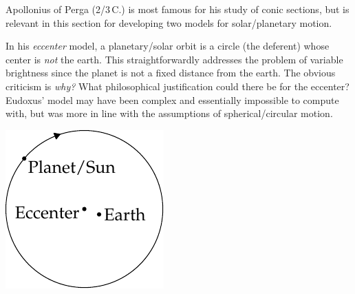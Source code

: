 \begin{minipage}[t]{0.74\linewidth}\vspace{0pt}
 Apollonius of Perga (2\nd/3\rd{}\,C.\BC) is most famous for his study of conic sections, but is relevant in this section for developing two models for solar/planetary motion.\smallbreak

In his \emph{eccenter} model, a planetary/solar orbit is a circle (the deferent) whose center is \emph{not} the earth. This straightforwardly addresses the problem of variable brightness since the planet is not a fixed distance from the earth.\smallbreak
    The obvious criticism is \emph{why?} What philosophical justification could there be for the eccenter? Eudoxus' model may have been complex and essentially impossible to compute with, but was more in line with the assumptions of spherical/circular motion.
\end{minipage}\hfill\begin{minipage}[t]{0.25\linewidth}\vspace{0pt}
  \flushright\includegraphics[scale=0.95]{trig-deferent}\phantom{b}
\end{minipage}\medbreak
  

